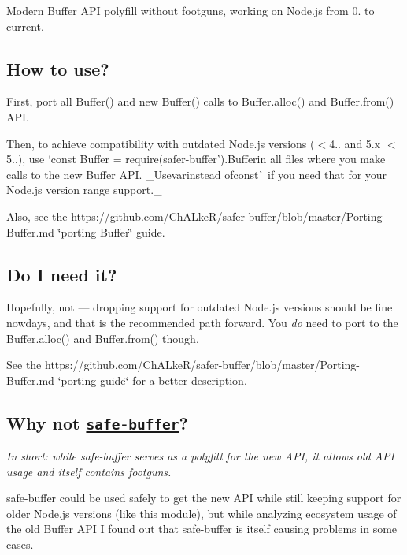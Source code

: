 Modern Buffer A\+PI polyfill without footguns, working on Node.\+js from 0. to current.

\subsection*{How to use?}

First, port all {\ttfamily Buffer()} and {\ttfamily new Buffer()} calls to {\ttfamily Buffer.\+alloc()} and {\ttfamily Buffer.\+from()} A\+PI.

Then, to achieve compatibility with outdated Node.\+js versions ({\ttfamily $<$4..} and 5.\+x {\ttfamily $<$5..}), use `const Buffer = require(\textquotesingle{}safer-\/buffer').Buffer{\ttfamily in all files where you make calls to the new Buffer A\+PI. \+\_\+\+Use}var{\ttfamily instead of}const\`{} if you need that for your Node.\+js version range support.\+\_\+

Also, see the https\+://github.com/\+Ch\+A\+Lke\+R/safer-\/buffer/blob/master/\+Porting-\/\+Buffer.\+md \char`\"{}porting Buffer\char`\"{} guide.

\subsection*{Do I need it?}

Hopefully, not — dropping support for outdated Node.\+js versions should be fine nowdays, and that is the recommended path forward. You {\itshape do} need to port to the {\ttfamily Buffer.\+alloc()} and {\ttfamily Buffer.\+from()} though.

See the https\+://github.com/\+Ch\+A\+Lke\+R/safer-\/buffer/blob/master/\+Porting-\/\+Buffer.\+md \char`\"{}porting guide\char`\"{} for a better description.

\subsection*{Why not \href{https://npmjs.com/safe-buffer}{\tt safe-\/buffer}?}

{\itshape In short\+: while {\ttfamily safe-\/buffer} serves as a polyfill for the new A\+PI, it allows old A\+PI usage and itself contains footguns.}

{\ttfamily safe-\/buffer} could be used safely to get the new A\+PI while still keeping support for older Node.\+js versions (like this module), but while analyzing ecosystem usage of the old Buffer A\+PI I found out that {\ttfamily safe-\/buffer} is itself causing problems in some cases.

